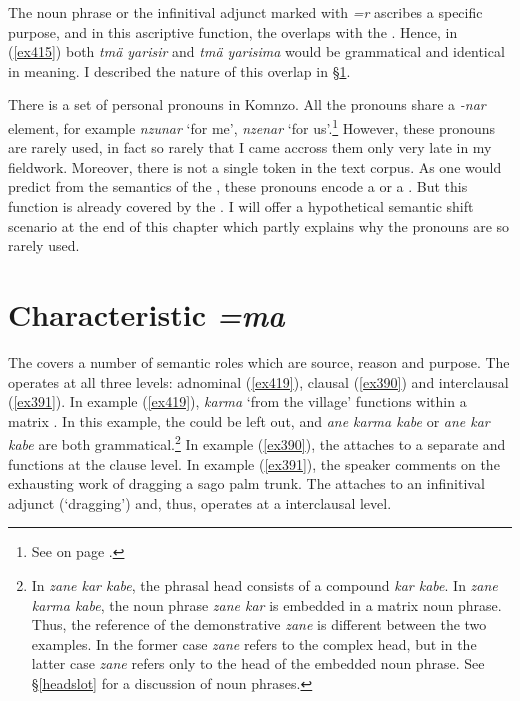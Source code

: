 The noun phrase or the infinitival adjunct marked with \emph{=r} ascribes a specific purpose, and in this ascriptive function, the  overlaps with the  . Hence, in (\ref{ex415}) both \emph{tmä yarisir} and \emph{tmä yarisima} would be grammatical and identical in meaning. I described the nature of this overlap in {\S}\ref{charcase}.

There is a set of  personal pronouns in Komnzo. All the pronouns share a \emph{-nar} element, for example \emph{nzunar} `for me', \emph{nzenar} `for us'.\footnote{See  on page \pageref{perspron-table}.} However, these pronouns are rarely used, in fact so rarely that I came accross them only very late in my fieldwork. Moreover, there is not a single token in the text corpus. As one would predict from the semantics of the  , these pronouns encode a  or a . But this function is already covered by the  . I will offer a hypothetical semantic shift scenario at the end of this chapter which partly explains why the  pronouns are so rarely used.

\section{Characteristic \emph{=ma}} \label{charcase}

The   covers a number of semantic roles which are source, reason and purpose. The  operates at all three levels: adnominal (\ref{ex419}), clausal (\ref{ex390}) and interclausal (\ref{ex391}). In example (\ref{ex419}), \emph{karma} `from the village' functions within a matrix . In this example, the  could be left out, and \emph{ane karma kabe} or \emph{ane kar kabe} are both grammatical.\footnote{In \emph{zane kar kabe}, the phrasal head consists of a compound \emph{kar kabe}. In \emph{zane karma kabe}, the noun phrase \emph{zane kar} is embedded in a matrix noun phrase. Thus, the reference of the demonstrative \emph{zane} is different between the two examples. In the former case \emph{zane} refers to the complex head, but in the latter case \emph{zane} refers only to the head of the embedded noun phrase. See {\S}\ref{headslot} for a discussion of noun phrases.} In example (\ref{ex390}), the   attaches to a separate  and functions at the clause level. In example (\ref{ex391}), the speaker comments on the exhausting work of dragging a sago palm trunk. The   attaches to an infinitival adjunct (`dragging') and, thus, operates at a interclausal level.

